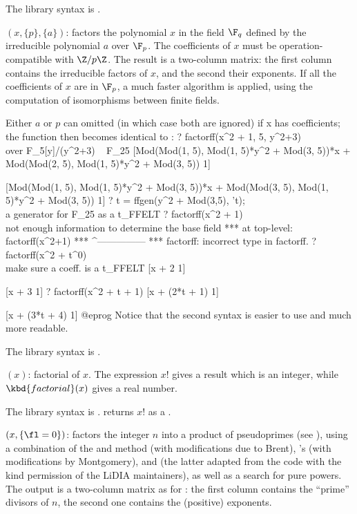 The library syntax is .

$(x,\{p\},\{a\})$: \label{se:factorff}factors the polynomial $x$ in the field
$\F_q$ defined by the irreducible polynomial $a$ over $\F_p$. The
coefficients of $x$ must be operation-compatible with $\Z/p\Z$. The result
is a two-column matrix: the first column contains the irreducible factors of
$x$, and the second their exponents. If all the coefficients of $x$ are in
$\F_p$, a much faster algorithm is applied, using the computation of
isomorphisms between finite fields.

Either $a$ or $p$ can omitted (in which case both are ignored) if x has
 coefficients; the function then becomes identical to :
\bprog
? factorff(x^2 + 1, 5, y^2+3)  \\ over F_5[y]/(y^2+3) ~ F_25
[Mod(Mod(1, 5), Mod(1, 5)*y^2 + Mod(3, 5))*x
 + Mod(Mod(2, 5), Mod(1, 5)*y^2 + Mod(3, 5)) 1]

[Mod(Mod(1, 5), Mod(1, 5)*y^2 + Mod(3, 5))*x
 + Mod(Mod(3, 5), Mod(1, 5)*y^2 + Mod(3, 5)) 1]
? t = ffgen(y^2 + Mod(3,5), 't); \\ a generator for F_25 as a t_FFELT
? factorff(x^2 + 1)   \\ not enough information to determine the base field
 ***   at top-level: factorff(x^2+1)
 ***                 ^---------------
 *** factorff: incorrect type in factorff.
? factorff(x^2 + t^0) \\ make sure a coeff. is a t_FFELT
[x + 2 1]

[x + 3 1]
? factorff(x^2 + t + 1)
[x + (2*t + 1) 1]

[x + (3*t + 4) 1]
@eprog\noindent
Notice that the second syntax is easier to use and much more readable.

The library syntax is .

$(x)$: \label{se:factorial}factorial of $x$. The expression $x!$ gives a result which is an integer,
while $\kbd{factorial}(x)$ gives a real number.

The library syntax is .
 returns $x!$ as a .

$(x,\{\fl=0\})$: \label{se:factorint}factors the integer $n$ into a product of
pseudoprimes (see ), using a combination of the
 and  method (with modifications due to
Brent), 's  (with modifications by Montgomery), and
 (the latter adapted from the  code with the kind
permission of the LiDIA maintainers), as well as a search for pure powers.
The output is a two-column matrix as for : the first column
contains the ``prime'' divisors of $n$, the second one contains the
(positive) exponents.

